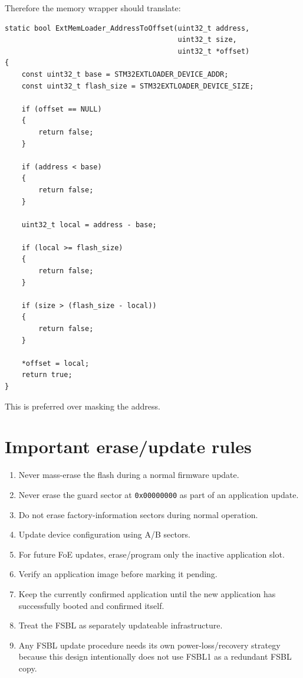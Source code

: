 \documentclass[10pt,a4paper,oneside]{report}
\providecommand{\tightlist}{\setlength{\itemsep}{1pt}\setlength{\parskip}{1pt}}
\begin{document}
Therefore the memory wrapper should translate:

\begin{verbatim}
static bool ExtMemLoader_AddressToOffset(uint32_t address,
                                         uint32_t size,
                                         uint32_t *offset)
{
    const uint32_t base = STM32EXTLOADER_DEVICE_ADDR;
    const uint32_t flash_size = STM32EXTLOADER_DEVICE_SIZE;

    if (offset == NULL)
    {
        return false;
    }

    if (address < base)
    {
        return false;
    }

    uint32_t local = address - base;

    if (local >= flash_size)
    {
        return false;
    }

    if (size > (flash_size - local))
    {
        return false;
    }

    *offset = local;
    return true;
}
\end{verbatim}

This is preferred over masking the address.

\section{Important erase/update rules}\label{wiki-reference-flash-layout-proposal--11-important-eraseupdate-rules}

\begin{enumerate}
\def\labelenumi{\arabic{enumi}.}
\tightlist
\item
  Never mass-erase the flash during a normal firmware update.
\item
  Never erase the guard sector at \texttt{0x00000000} as part of an application update.
\item
  Do not erase factory-information sectors during normal operation.
\item
  Update device configuration using A/B sectors.
\item
  For future FoE updates, erase/program only the inactive application slot.
\item
  Verify an application image before marking it pending.
\item
  Keep the currently confirmed application until the new application has successfully booted and confirmed itself.
\item
  Treat the FSBL as separately updateable infrastructure.
\item
  Any FSBL update procedure needs its own power-loss/recovery strategy because this design intentionally does not use FSBL1 as a redundant FSBL copy.
\end{enumerate}
\end{document}
